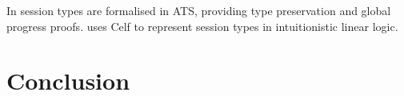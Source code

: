 \documentclass{mproj}
\begin{document}
In \cite{Xi2016} session types are formalised in ATS, providing type preservation and global progress proofs. \cite{Bock2016} uses Celf to represent session types in intuitionistic linear logic.
\chapter{Conclusion}\label{conclusion}



\end{document}
